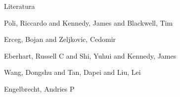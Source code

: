 \documentclass{beamer}
\begin{document}
\begin{frame}{Literatura}

\begin{thebibliography}{10}
\alert{Poli, Riccardo and Kennedy, James and Blackwell, Tim}

\alert{Erceg, Bojan and Zeljkovic, Cedomir}

\alert{Eberhart, Russell C and Shi, Yuhui and Kennedy, James}

\alert{Wang, Dongshu and Tan, Dapei and Liu, Lei}

\alert{Engelbrecht, Andries P}


\end{thebibliography}

\end{frame}
\end{document}
